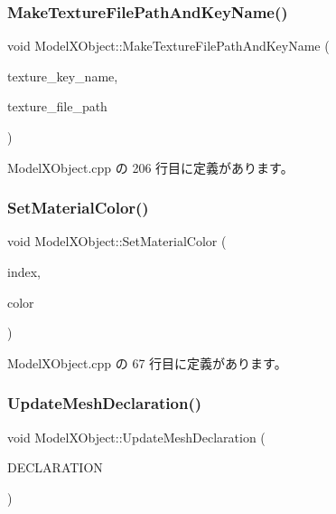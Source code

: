 \subsubsection{\texorpdfstring{Make\+Texture\+File\+Path\+And\+Key\+Name()}{MakeTextureFilePathAndKeyName()}}
{\footnotesize\ttfamily void Model\+X\+Object\+::\+Make\+Texture\+File\+Path\+And\+Key\+Name (\begin{DoxyParamCaption}\item[{std\+::string $\ast$}]{texture\+\_\+key\+\_\+name,  }\item[{std\+::string $\ast$}]{texture\+\_\+file\+\_\+path }\end{DoxyParamCaption})\hspace{0.3cm}{\ttfamily [private]}}



 Model\+X\+Object.\+cpp の 206 行目に定義があります。

\mbox{\label{class_model_x_object_acc6b5f187b74b421451c8c2c7c2964d7}} 
\subsubsection{\texorpdfstring{Set\+Material\+Color()}{SetMaterialColor()}}
{\footnotesize\ttfamily void Model\+X\+Object\+::\+Set\+Material\+Color (\begin{DoxyParamCaption}\item[{unsigned}]{index,  }\item[{\mbox{\hyperlink{_vector3_d_8h_a680c30c4a07d86fe763c7e01169cd6cc}{X\+Color4}}}]{color }\end{DoxyParamCaption})}



 Model\+X\+Object.\+cpp の 67 行目に定義があります。

\mbox{\label{class_model_x_object_ac005f3f164a1f75d6cfc0772e2e95382}} 
\subsubsection{\texorpdfstring{Update\+Mesh\+Declaration()}{UpdateMeshDeclaration()}}
{\footnotesize\ttfamily void Model\+X\+Object\+::\+Update\+Mesh\+Declaration (\begin{DoxyParamCaption}\item[{const D3\+D\+V\+E\+R\+T\+E\+X\+E\+L\+E\+M\+E\+N\+T9 $\ast$}]{D\+E\+C\+L\+A\+R\+A\+T\+I\+ON }\end{DoxyParamCaption})}



